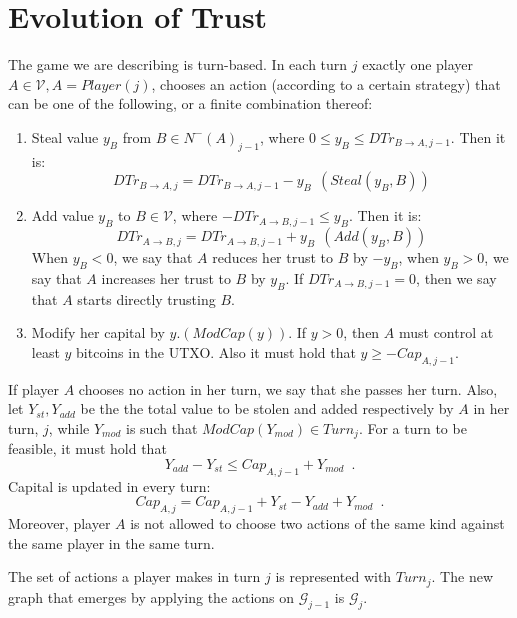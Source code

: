 \documentclass[11pt]{llncs}
\theoremstyle{definition}
\begin{document}
   \section{Evolution of Trust}
     \begin{definition}[Turns]
        The game we are describing is turn-based. In each turn $j$ exactly one player $A \in \mathcal{V}, A =
        Player\left(j\right)$, chooses an action (according to a certain strategy) that can be one of the following, or a
        finite combination thereof:
        \begin{enumerate}
           \item Steal value $y_B$ from $B \in N^{-}\left(A\right)_{j-1}$, where
           $0 \leq y_B \leq DTr_{B \rightarrow A, j-1}$. Then it is:
           \begin{equation*}
              DTr_{B \rightarrow A, j} = DTr_{B \rightarrow A, j-1} - y_B \:\: \left(Steal\left(y_B, B\right)\right)
           \end{equation*}
           \item Add value $y_B$ to $B \in \mathcal{V}$, where $-DTr_{A \rightarrow B, j-1} \leq y_B$. Then it is:
           \begin{equation*}
              DTr_{A \rightarrow B, j} = DTr_{A \rightarrow B, j-1} + y_B \:\: \left(Add\left(y_B, B\right)\right)
           \end{equation*}
           When $y_B < 0$, we say that $A$ reduces her trust to $B$ by $-y_B$, when $y_B > 0$, we say that $A$ increases her
           trust to $B$ by $y_B$. If $DTr_{A \rightarrow B, j-1} = 0$, then we say that $A$ starts directly trusting $B$.
           \item Modify her capital by $y. \left(ModCap\left(y\right)\right)$. If $y > 0$, then $A$ must control at least
           $y$ bitcoins in the UTXO. Also it must hold that $y \geq -Cap_{A, j-1}$.
        \end{enumerate}
        If player $A$ chooses no action in her turn, we say that she passes her turn. Also, let $Y_{st}, Y_{add}$ be the
        the total value to be stolen and added respectively by $A$ in her turn, $j$, while $Y_{mod}$ is such that
        $ModCap\left(Y_{mod}\right) \in Turn_j$. For a turn to be feasible, it must hold that
        \begin{equation}
           Y_{add} - Y_{st} \leq Cap_{A, j-1} + Y_{mod} \enspace.
        \end{equation}
        Capital is updated in every turn:
        \begin{equation}
           Cap_{A, j} = Cap_{A, j-1} + Y_{st} - Y_{add} + Y_{mod} \enspace.
        \end{equation}
        Moreover, player $A$ is not allowed to choose two actions of the same kind against the same player in the same turn.

        The set of actions a player makes in turn $j$ is represented with $Turn_j$. The new graph that emerges by applying
        the actions on $\mathcal{G}_{j-1}$ is $\mathcal{G}_j$.
     \end{definition}
\end{document}
